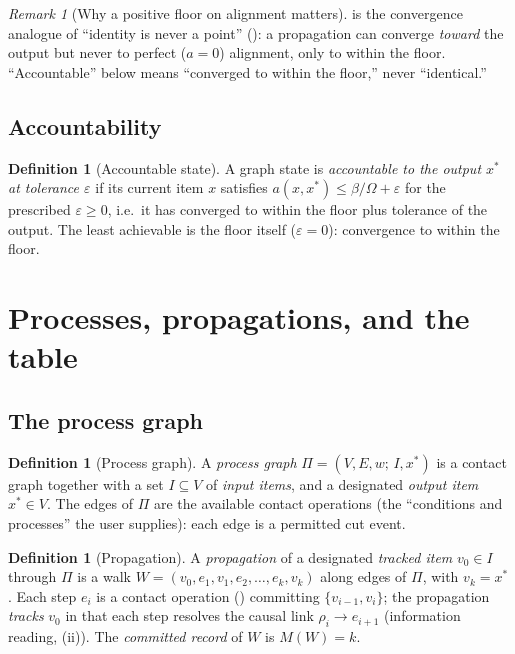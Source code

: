 \documentclass[11pt,twocolumn,a4paper]{article}
\theoremstyle{thmstyle}
\theoremstyle{definition}
\newtheorem{definition}[theorem]{Definition}
\theoremstyle{remark}
\newtheorem{remark}[theorem]{Remark}
\newcommand{\V}{V}
\newcommand{\E}{E}
\newcommand{\wt}{w}
\newcommand{\flo}{\beta}                 %
\newcommand{\rec}{M}                     %
\newcommand{\res}{\rho}                  %
\newcommand{\Proc}{\Pi}                  %
\newcommand{\eps}{\varepsilon}
\begin{document}
\begin{remark}[Why a positive floor on alignment matters]
\label{rem:align-floor}
 is the convergence analogue of ``identity is never
a point'' (): a propagation can converge \emph{toward} the
output but never to perfect ($a=0$) alignment, only to within the floor.
``Accountable'' below means ``converged to within the floor,'' never
``identical.''
\end{remark}

\subsection{Accountability}

\begin{definition}[Accountable state]
\label{def:accountable}
A graph state is \emph{accountable to the output $x^{\ast}$ at tolerance
$\eps$} if its current item $x$ satisfies $a(x,x^{\ast})\le\flo/\Omega+\eps$
for the prescribed $\eps\ge0$, i.e.\ it has converged to within the floor
plus tolerance of the output. The least achievable is the floor itself
($\eps=0$): convergence to within the floor.
\end{definition}

\section{Processes, propagations, and the table}
\label{sec:table}

\subsection{The process graph}

\begin{definition}[Process graph]
\label{def:process-graph}
A \emph{process graph} $\Proc=(\V,\E,\wt;\,I,x^{\ast})$ is a contact graph
together with a set $I\subseteq\V$ of \emph{input items}, and a designated
\emph{output item} $x^{\ast}\in\V$. The edges of $\Proc$ are the available
contact operations (the ``conditions and processes'' the user supplies):
each edge is a permitted cut event.
\end{definition}

\begin{definition}[Propagation]
\label{def:propagation}
A \emph{propagation} of a designated \emph{tracked item} $v_0\in I$ through
$\Proc$ is a walk $W=(v_0,e_1,v_1,e_2,\dots,e_k,v_k)$ along edges of
$\Proc$, with $v_k=x^{\ast}$. Each step $e_i$ is a contact operation
() committing $\{v_{i-1},v_i\}$; the propagation
\emph{tracks} $v_0$ in that each step resolves the causal link
$\res_i\to e_{i+1}$ (information reading, (ii)).
The \emph{committed record} of $W$ is $\rec(W)=k$.
\end{definition}
\end{document}
